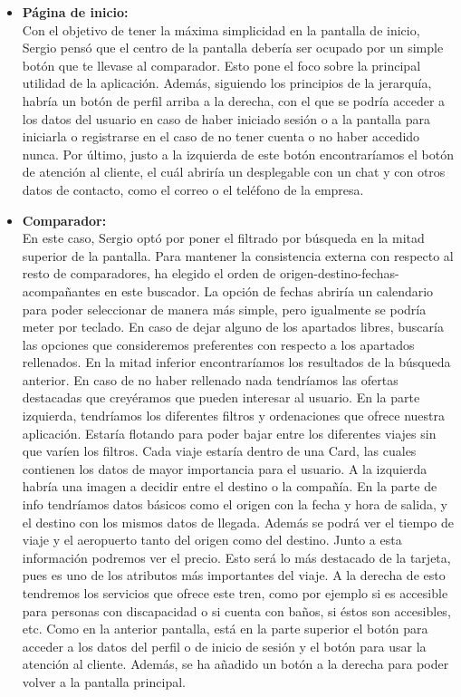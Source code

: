 \begin{itemize}
    \item\textbf{Página de inicio:} \\ Con el objetivo de tener la máxima simplicidad en la pantalla de inicio, Sergio pensó que el centro de la pantalla debería ser ocupado por un simple botón que te llevase al comparador. Esto pone el foco sobre la principal utilidad de la aplicación. Además, siguiendo los principios de la jerarquía, habría un botón de perfil arriba a la derecha, con el que se podría acceder a los datos del usuario en caso de haber iniciado sesión o a la pantalla para iniciarla o registrarse en el caso de no tener cuenta o no haber accedido nunca. Por último, justo a la izquierda de este botón encontraríamos el botón de atención al cliente, el cuál abriría un desplegable con un chat y con otros datos de contacto, como el correo o el teléfono de la empresa.
    \item\textbf{Comparador:} \\ En este caso, Sergio optó por poner el filtrado por búsqueda en la mitad superior de la pantalla. Para mantener la consistencia externa con respecto al resto de comparadores, ha elegido el orden de origen-destino-fechas-acompañantes en este buscador. La opción de fechas abriría un calendario para poder seleccionar de manera más simple, pero igualmente se podría meter por teclado. En caso de dejar alguno de los apartados libres, buscaría las opciones que consideremos preferentes con respecto a los apartados rellenados. En la mitad inferior encontraríamos los resultados de la búsqueda anterior. En caso de no haber rellenado nada tendríamos las ofertas destacadas que creyéramos que pueden interesar al usuario. En la parte izquierda, tendríamos los diferentes filtros y ordenaciones que ofrece nuestra aplicación. Estaría flotando para poder bajar entre los diferentes viajes sin que varíen los filtros. Cada viaje estaría dentro de una Card, las cuales contienen los datos de mayor importancia para el usuario. A la izquierda habría una imagen a decidir entre el destino o la compañía. En la parte de info tendríamos datos básicos como el origen con la fecha y hora de salida, y el destino con los mismos datos de llegada. Además se podrá ver el tiempo de viaje y el aeropuerto tanto del origen como del destino. Junto a esta información podremos ver el precio. Esto será lo más destacado de la tarjeta, pues es uno de los atributos más importantes del viaje. A la derecha de esto tendremos los servicios que ofrece este tren, como por ejemplo si es accesible para personas con discapacidad o si cuenta con baños, si éstos son accesibles, etc. Como en la anterior pantalla, está en la parte superior el botón para acceder a los datos del perfil o de inicio de sesión y el botón para usar la atención al cliente. Además, se ha añadido un botón a la derecha para poder volver a la pantalla principal.

\end{itemize}
